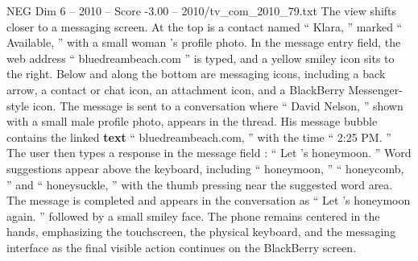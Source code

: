 \begin{textsample}{NEG Dim 6 – 2010 – Score -3.00 – 2010/tv\_com\_2010\_79.txt}
The view shifts closer to a messaging screen.
At the top is a contact named “ Klara, ” marked “ Available, ” with a small woman ’s profile photo.
In the message entry field, the web address “ bluedreambeach.com ” is typed, and a yellow smiley icon sits to the right.
Below and along the bottom are messaging icons, including a back arrow, a contact or chat icon, an attachment icon, and a BlackBerry Messenger-style icon.
The message is sent to a conversation where “ David Nelson, ” shown with a small male profile photo, appears in the thread.
His message bubble contains the linked \textbf{text} “ bluedreambeach.com, ” with the time “ 2:25 PM. ” The user then types a response in the message field : “ Let ’s honeymoon. ” Word suggestions appear above the keyboard, including “ honeymoon, ” “ honeycomb, ” and “ honeysuckle, ” with the thumb pressing near the suggested word area.
The message is completed and appears in the conversation as “ Let ’s honeymoon again. ” followed by a small smiley face.
The phone remains centered in the hands, emphasizing the touchscreen, the physical keyboard, and the messaging interface as the final visible action continues on the BlackBerry screen.

\end{textsample}
